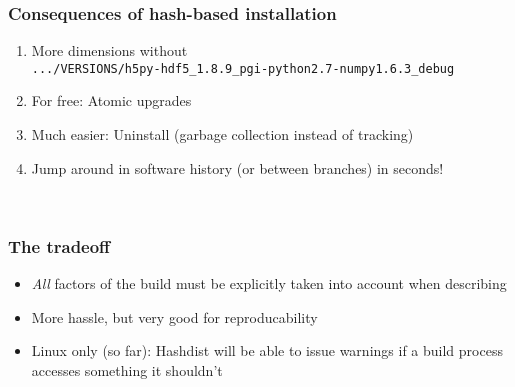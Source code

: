 \documentclass[sans,mathserif]{beamer}
\begin{document}
\begin{frame}
  \frametitle{Consequences of hash-based installation}
  \begin{enumerate}
  \item<+-> More dimensions without\\
{\footnotesize
{\tt .../VERSIONS/h5py-hdf5\_1.8.9\_pgi-python2.7-numpy1.6.3\_debug}
}

  \item<+-> For free: Atomic upgrades
  \item<+-> Much easier: Uninstall (garbage collection instead of tracking)
  \item<+-> Jump around in software history (or between branches) in seconds!
  \end{enumerate}

~

\end{frame}


\begin{frame}
  \frametitle{The tradeoff}

  \begin{itemize}
  \item<+-> {\em All} factors of the build must be explicitly taken into account
    when describing
  \item<+-> More hassle, but very good for reproducability
  \item<+-> Linux only (so far): Hashdist will be able to issue warnings
    if a build process accesses something it shouldn't
  \end{itemize}

\end{frame}


\end{document}
